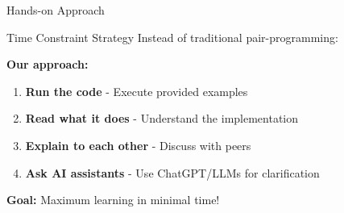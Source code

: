 \documentclass[../main.tex]{subfiles}
\begin{document}
\begin{frame}{Hands-on Approach}
    \begin{alertblock}{Time Constraint Strategy}
        Instead of traditional pair-programming:
    \end{alertblock}

    \textbf{Our approach:}
    \begin{enumerate}
        \item \textbf{Run the code} - Execute provided examples
        \item \textbf{Read what it does} - Understand the implementation
        \item \textbf{Explain to each other} - Discuss with peers
        \item \textbf{Ask AI assistants} - Use ChatGPT/LLMs for clarification
    \end{enumerate}

    \bigskip

    \textbf{Goal:} Maximum learning in minimal time!
\end{frame}
\end{document}
